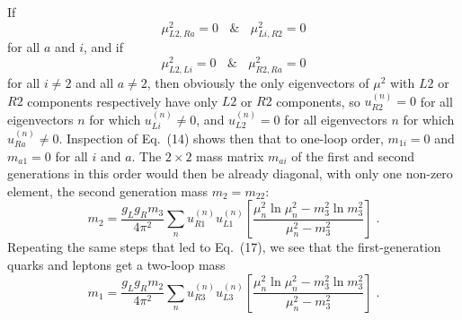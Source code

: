 If 
\begin{equation}
\mu^2_{L2,Ra}=0 ~~~~\&~~~~\mu^2_{Li,R2}=0
\end{equation}
for all $a$ and $i$, and if
\begin{equation}
\mu^2_{L2,Li}=0 ~~~~\&~~~~\mu^2_{R2,Ra}=0
\end{equation}
for all $i\neq 2$ and all $a\neq 2$, then obviously the only eigenvectors of $\mu^2$ with $L2$ or $R2$ components respectively have only $L2$ or $R2$ components, so 
 $u^{(n)}_{R2}=0$ for all eigenvectors $n$ for which 
$u^{(n)}_{Li}\neq 0$, and  $u^{(n)}_{L2}=0$  for all eigenvectors $n$ for which $u^{(n)}_{Ra}\neq 0$.  Inspection of Eq.~(14) shows then that to one-loop order, 
$m_{1i}=0$ and $m_{a1}=0$ for all $i$ and $a$.  The $2\times 2$ mass matrix $m_{ai}$ of the first and second generations in this order would then be already diagonal, with only one non-zero element, the  second generation mass $m_2=m_{22}$:
\begin{equation}
m_2=\frac{g_Lg_R m_3}{4\pi^2}\sum_{n}  u_{R1}^{(n)}u_{L1}^{(n)}\left[\frac{\mu_n^2\ln \mu_n^2-m_3^2\ln m_3^2}{\mu_n^2-m_3^2}
\right]\;.
\end{equation}
Repeating the same steps that led to Eq.~(17),  we see that the  first-generation quarks and leptons  get a two-loop mass
\begin{equation}
m_1=\frac{g_Lg_R m_2}{4\pi^2}\sum_{n}  u_{R3}^{(n)}u_{L3}^{(n)}\left[\frac{\mu_n^2\ln \mu_n^2-m_3^2\ln m_3^2}{\mu_n^2-m_3^2}\right]\;.
\end{equation}





